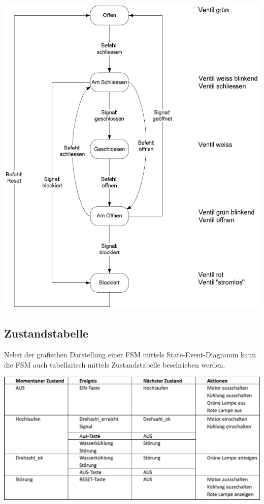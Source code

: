 \begin{center}
    \includegraphics[width=0.8\columnwidth]{images/state_event_example.png}
\end{center}


\subsection{Zustandstabelle}

Nebst der grafischen Darstellung einer FSM mittels State-Event-Diagramm kann die FSM auch tabellarisch mittels Zustandstabelle 
beschrieben werden.



\includegraphics[width=\columnwidth]{images/zustandstabelle.pdf}

